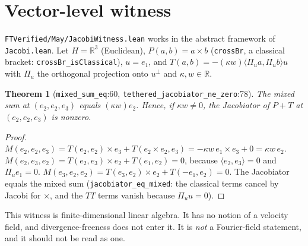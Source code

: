 \documentclass[11pt]{article}\emergencystretch=2em
\newtheorem{theorem}{Theorem}\newtheorem{lemma}[theorem]{Lemma}\newtheorem{proposition}[theorem]{Proposition}
\theoremstyle{definition}\newtheorem{definition}[theorem]{Definition}\theoremstyle{remark}\newtheorem{remark}[theorem]{Remark}
\begin{document}
\section{Vector-level witness}
\texttt{FTVerified/May/JacobiWitness.lean} works in the abstract framework of \texttt{Jacobi.lean}. Let $H=\mathbb R^3$ (Euclidean), $P(a,b)=a\times b$ (\texttt{crossBr}, a classical bracket: \texttt{crossBr\_isClassical}), $u=e_1$, and $T(a,b)=-(\kappa w)\langle\Pi_u a,\Pi_u b\rangle u$ with $\Pi_u$ the orthogonal projection onto $u^\perp$ and $\kappa,w\in\mathbb R$.
\begin{theorem}[\texttt{mixed\_sum\_eq}:60, \texttt{tethered\_jacobiator\_ne\_zero}:78]\label{thm:vec}
The mixed sum at $(e_2,e_2,e_3)$ equals $(\kappa w)e_2$. Hence, if $\kappa w\ne0$, the Jacobiator of $P+T$ at $(e_2,e_2,e_3)$ is nonzero.
\end{theorem}
\begin{proof}
$M(e_2,e_2,e_3)=T(e_2,e_2)\times e_3+T(e_2\times e_2,e_3)=-\kappa w\,e_1\times e_3+0=\kappa w\,e_2$.
$M(e_2,e_3,e_2)=T(e_2,e_3)\times e_2+T(e_1,e_2)=0$, because $\langle e_2,e_3\rangle=0$ and $\Pi_ue_1=0$.
$M(e_3,e_2,e_2)=T(e_3,e_2)\times e_2+T(-e_1,e_2)=0$.
The Jacobiator equals the mixed sum (\texttt{jacobiator\_eq\_mixed}: the classical terms cancel by Jacobi for $\times$, and the $TT$ terms vanish because $\Pi_u u=0$).
\end{proof}
This witness is finite-dimensional linear algebra. It has no notion of a velocity field, and divergence-freeness does not enter it. It is \emph{not} a Fourier-field statement, and it should not be read as one.
\end{document}
